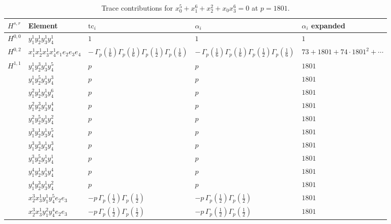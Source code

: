 \documentclass[11pt]{article}
\begin{document}
\begin{table}[ht]
\centering
\caption{Trace contributions for $x_0^{5} + x_1^{6} + x_2^{2} + x_0 x_3^{6} = 0$ at $p=1801$.}\label{tab:deformed-75}
\renewcommand{\arraystretch}{1.1}
{\scriptsize
\begin{tabular}{@{}lllll@{}}
\toprule
$H^{s,r}$ & Element & $\mathrm{tc}_i$ & $\alpha_i$ & $\alpha_i$ expanded \\
\midrule
$H^{0,0}$ & $y_{1}^{1} y_{2}^{1} y_{3}^{1} y_{4}^{1}$ & $1$ & $1$ & $1$ \\
\midrule
$H^{0,2}$ & $x_{1}^{1} x_{2}^{1} x_{3}^{1} x_{4}^{1}  e_{1} e_{2} e_{3} e_{4}$ & $- \, \Gamma_p \left( \frac{1}{6} \right) \Gamma_p \left( \frac{1}{6} \right) \Gamma_p \left( \frac{1}{2} \right) \Gamma_p \left( \frac{1}{6} \right)$ & $- \, \Gamma_p \left( \frac{1}{6} \right) \Gamma_p \left( \frac{1}{6} \right) \Gamma_p \left( \frac{1}{2} \right) \Gamma_p \left( \frac{1}{6} \right)$ & $73{+}1801{+}74{\cdot}1801^{2}{+}\cdots$ \\
\midrule
$H^{1,1}$ & $y_{1}^{1} y_{2}^{3} y_{3}^{1} y_{4}^{5}$ & $p \,$ & $p \,$ & $1801$ \\
 & $y_{1}^{1} y_{2}^{5} y_{3}^{1} y_{4}^{3}$ & $p \,$ & $p \,$ & $1801$ \\
 & $y_{1}^{2} y_{2}^{1} y_{3}^{1} y_{4}^{6}$ & $p \,$ & $p \,$ & $1801$ \\
 & $y_{1}^{2} y_{2}^{3} y_{3}^{1} y_{4}^{4}$ & $p \,$ & $p \,$ & $1801$ \\
 & $y_{1}^{2} y_{2}^{5} y_{3}^{1} y_{4}^{2}$ & $p \,$ & $p \,$ & $1801$ \\
 & $y_{1}^{3} y_{2}^{1} y_{3}^{1} y_{4}^{5}$ & $p \,$ & $p \,$ & $1801$ \\
 & $y_{1}^{3} y_{2}^{3} y_{3}^{1} y_{4}^{3}$ & $p \,$ & $p \,$ & $1801$ \\
 & $y_{1}^{3} y_{2}^{5} y_{3}^{1} y_{4}^{1}$ & $p \,$ & $p \,$ & $1801$ \\
 & $y_{1}^{4} y_{2}^{1} y_{3}^{1} y_{4}^{4}$ & $p \,$ & $p \,$ & $1801$ \\
 & $y_{1}^{4} y_{2}^{3} y_{3}^{1} y_{4}^{2}$ & $p \,$ & $p \,$ & $1801$ \\
 & $x_{2}^{3} x_{3}^{1} y_{1}^{1} y_{4}^{5} e_{2} e_{3}$ & $- p \, \Gamma_p \left( \frac{1}{2} \right) \Gamma_p \left( \frac{1}{2} \right)$ & $- p \, \Gamma_p \left( \frac{1}{2} \right) \Gamma_p \left( \frac{1}{2} \right)$ & $1801$ \\
 & $x_{2}^{3} x_{3}^{1} y_{1}^{2} y_{4}^{4} e_{2} e_{3}$ & $- p \, \Gamma_p \left( \frac{1}{2} \right) \Gamma_p \left( \frac{1}{2} \right)$ & $- p \, \Gamma_p \left( \frac{1}{2} \right) \Gamma_p \left( \frac{1}{2} \right)$ & $1801$ \\

\end{tabular}}
\end{table}
\end{document}
